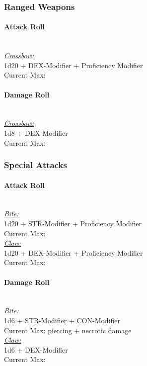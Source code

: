 \documentclass[letterpaper,openany,oneside,twocolumn]{book}
\newcommand{\PATH}{../../}
\begin{document}
\subsubsection*{Ranged Weapons}
\paragraph*{Attack Roll}\hfill\\
\underline{\textit{Crossbow:}}\\
1d20 + DEX-Modifier + Proficiency Modifier\\
\indent Current Max: 
\paragraph*{Damage Roll}\hfill\\
\underline{\textit{Crossbow:}}\\
1d8 + DEX-Modifier\\
\indent Current Max: 
\subsubsection*{Special Attacks}
\paragraph*{Attack Roll}\hfill\\
\underline{\textit{Bite:}}\\
1d20 + STR-Modifier + Proficiency Modifier\\
\indent Current Max: \\
\underline{\textit{Claw:}}\\
1d20 + DEX-Modifier + Proficiency Modifier\\
\indent Current Max: 
\paragraph*{Damage Roll}\hfill\\
\underline{\textit{Bite:}}\\
1d6 + STR-Modifier + CON-Modifier\\
\indent Current Max:  piercing +  necrotic damage\\
\underline{\textit{Claw:}}\\
1d6 + DEX-Modifier\\
\indent Current Max: 




\end{document}
